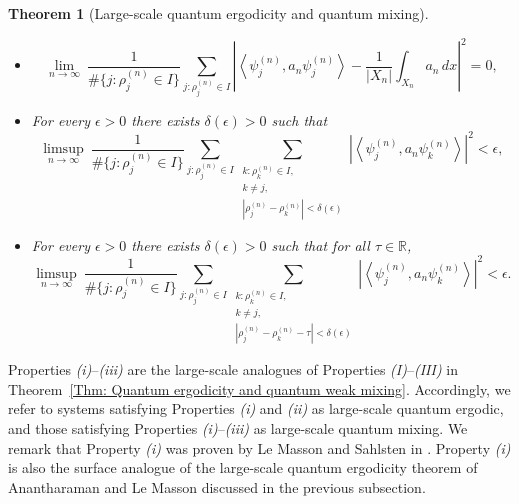 \documentclass[11pt,twoside,reqno]{amsart} \usepackage{a4wide} \usepackage[T1]{fontenc} \usepackage[utf8]{inputenc} \usepackage{soul}  \usepackage{amsmath} \usepackage{amsfonts} \usepackage{amssymb} \usepackage{mathtools} \usepackage{amsthm} \usepackage{xcolor} \usepackage{graphicx} \usepackage{hyperref} \usepackage{standalone} \usepackage{esint} \usepackage{comment} \usepackage[left=2.3cm,top=3cm,right=2.3cm]{geometry} \usepackage{bm} \usepackage{svg} \usepackage{float} \numberwithin{equation}{section} \theoremstyle{plain} \newtheorem{thm}{Theorem}[section] \newtheorem{theorem}[thm]{Theorem} \newtheorem*{theorem*}{Theorem}\newtheorem{conj}[thm]{Conjecture} \newtheorem{lemma}[thm]{Lemma} \newtheorem{prop}[thm]{Proposition} \newtheorem{proposition}[thm]{Proposition} \newtheorem{cor}[thm]{Corollary} \newtheorem{question}[thm]{Question} \newtheorem{corollary}[thm]{Corollary} \newtheorem{assumption}[thm]{Assumption} \theoremstyle{definition} \newtheorem{defn}[thm]{Definition} \newtheorem{choice}[thm]{Choice} \newtheorem{definition}[thm]{Definition} \newtheorem{ex}[thm]{Example} \newtheorem{notation}[thm]{Notation} \newtheorem*{ack}{Acknowledgements} \theoremstyle{remark} \newtheorem{remark}[thm]{Remark} \newtheorem{bigremark}[thm]{Remark} \usepackage{xcolor} \newcommand{\red}[1]{ {\color{Red}#1} } \newcommand{\blue}[1]{ {\color{Blue}#1} } \author{Kai Hippi} \address{Aalto University, Espoo, Finland} \email{kai.hippi@aalto.fi}
\begin{document}
\begin{theorem}[Large-scale quantum ergodicity and quantum mixing]
\begin{itemize}
    \item[(i)] 
    $$
        \lim_{n \to \infty} \
        \frac{1}{ \# \{ j  :  \rho_{j}^{( n )} \in I \} }
        \sum_{j : \rho_{j}^{(n)} \in I}
        \left|
            \left\langle \psi_{j}^{(n)}, a_{n} \psi_{j}^{(n)} \right\rangle
            - \frac{1}{| X_{n} |} \int_{X_{n}} a_n \, dx
        \right|^{2} = 0,
    $$
    \item[(ii)] 
    For every \( \epsilon > 0 \) there exists \( \delta(\epsilon) > 0 \) such that
    \[
        \limsup_{n \to \infty} \
        \frac{1}{ \# \{ j  :  \rho_{j}^{( n )} \in I \} }
        \sum_{j : \rho_{j}^{(n)} \in I}
        \sum_{\substack{k: \rho_{k}^{( n )} \in I, \\ k \neq j, \\ | \rho_{j}^{(n)} - \rho_{k}^{(n)} | < \delta( \epsilon )}}
        \left| \left\langle \psi_{j}^{(n)}, a_{n} \psi_{k}^{(n)} \right\rangle \right|^{2}
        < \epsilon,
    \]
    \item[(iii)]
    For every \( \epsilon > 0 \) there exists \( \delta(\epsilon) > 0 \) such that for all \( \tau \in \mathbb{R} \),
    \[
        \limsup_{n \to \infty} \
        \frac{1}{ \# \{  j : \rho_{j}^{( n )} \in I \} }
        \sum_{j: \rho_{j}^{(n)} \in I}
        \sum_{\substack{k : \rho_{k}^{( n )} \in I, \\ k \neq j , \\ | \rho_{j}^{(n)} - \rho_{k}^{(n)} - \tau | < \delta( \epsilon )}}
        \left| \left\langle \psi_{j}^{(n)}, a_{n} \psi_{k}^{(n)} \right\rangle \right|^{2}
        < \epsilon.
    \]
\end{itemize}
\end{theorem}

Properties \emph{(i)}--\emph{(iii)} are the large-scale analogues of Properties \emph{(I)}--\emph{(III)} in Theorem~\ref{Thm: Quantum ergodicity and quantum weak mixing}. Accordingly, we refer to systems satisfying Properties \emph{(i)} and \emph{(ii)} as large-scale quantum ergodic, and those satisfying Properties \emph{(i)}--\emph{(iii)} as large-scale quantum mixing. We remark that Property \emph{(i)} was proven by Le Masson and Sahlsten in \cite{LS17}. Property \emph{(i)} is also the surface analogue of the large-scale quantum ergodicity theorem of Anantharaman and Le Masson \cite{AL15} discussed in the previous subsection.  
\end{document}
